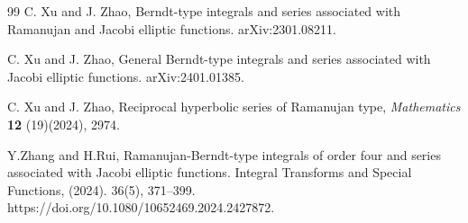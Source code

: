 \documentclass[11pt]{article}
\theoremstyle{plain}
\theoremstyle{definition}
\begin{document}
\begin{thebibliography}{99}
C. Xu and J. Zhao, Berndt-type integrals and series associated with Ramanujan and Jacobi elliptic functions. arXiv:2301.08211.

C. Xu and J. Zhao, General Berndt-type integrals and series associated with Jacobi elliptic functions. arXiv:2401.01385.

C. Xu and J. Zhao, Reciprocal hyperbolic series of Ramanujan type, \emph{Mathematics} \textbf{12} (19)(2024), 2974.

Y.Zhang  and H.Rui,  Ramanujan-Berndt-type integrals of order four and series associated with Jacobi elliptic functions. Integral Transforms and Special Functions, (2024). 36(5), 371–399. https://doi.org/10.1080/10652469.2024.2427872.

		
\end{thebibliography}
	
\end{document}
